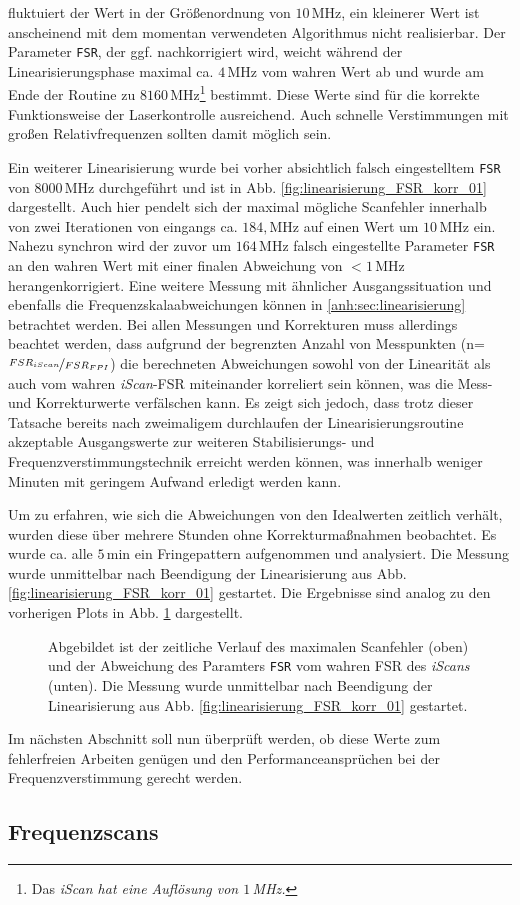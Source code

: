 fluktuiert der Wert in der Größenordnung von $10\,$MHz, ein kleinerer Wert ist
anscheinend mit dem momentan verwendeten Algorithmus nicht realisierbar. Der
Parameter \lstinline|FSR|, der ggf. nachkorrigiert wird, weicht während der
Linearisierungsphase maximal ca. $4\,$MHz vom wahren Wert ab und wurde am Ende
der Routine zu $8160\,$MHz\footnote{Das \textit{iScan hat eine Auflösung von
$1\,$MHz.}} bestimmt. Diese Werte sind für die korrekte Funktionsweise der
Laserkontrolle ausreichend. Auch schnelle Verstimmungen mit großen
Relativfrequenzen sollten damit möglich sein.\par
Ein weiterer Linearisierung wurde bei vorher absichtlich falsch eingestelltem
\lstinline|FSR| von $8000\,$MHz durchgeführt und ist in Abb.
\ref{fig:linearisierung_FSR_korr_01} dargestellt. Auch hier pendelt sich der
maximal mögliche Scanfehler innerhalb von zwei Iterationen von eingangs ca.
$184,$MHz auf einen Wert um $10\,$MHz ein. Nahezu synchron wird der zuvor um
$164\,$MHz falsch eingestellte Parameter \lstinline|FSR| an den wahren Wert
mit einer finalen Abweichung von $<1\,$MHz herangenkorrigiert. Eine weitere
Messung mit ähnlicher Ausgangssituation und ebenfalls die
Frequenzskalaabweichungen können in \ref{anh:sec:linearisierung} betrachtet
werden. Bei allen Messungen und Korrekturen muss allerdings beachtet werden,
dass aufgrund der begrenzten Anzahl von Messpunkten
(n=$\nicefrac{FSR_{iScan}}{FSR_{FPI}}$) die berechneten Abweichungen sowohl von
der Linearität als auch vom wahren \textit{iScan}-FSR miteinander korreliert
sein können, was die Mess- und Korrekturwerte verfälschen kann. Es zeigt sich
jedoch, dass trotz dieser Tatsache bereits nach zweimaligem durchlaufen der
Linearisierungsroutine akzeptable Ausgangswerte zur weiteren Stabilisierungs- und
Frequenzverstimmungstechnik erreicht werden können, was innerhalb weniger
Minuten mit geringem Aufwand erledigt werden kann.\par
Um zu erfahren, wie sich die Abweichungen von den Idealwerten zeitlich verhält,
wurden diese über mehrere Stunden ohne Korrekturmaßnahmen beobachtet. Es wurde
ca. alle $5\,$min ein Fringepattern aufgenommen und analysiert. Die
Messung wurde unmittelbar nach Beendigung der Linearisierung aus Abb.
\ref{fig:linearisierung_FSR_korr_01} gestartet.
Die Ergebnisse sind analog zu den vorherigen Plots in Abb.
\ref{fig:linearitaet_verlauf} dargestellt.
\begin{figure}[h]
 	\centering
 	\footnotesize
	
	\caption[Linearitaet \textit{iScan}, zeitlicher Verlauf]{Abgebildet
	ist der zeitliche Verlauf des maximalen Scanfehler (oben) und der Abweichung
	des Paramters \lstinline|FSR| vom wahren FSR des \textit{iScans} (unten). Die
	Messung wurde unmittelbar nach Beendigung der Linearisierung aus Abb.
	\ref{fig:linearisierung_FSR_korr_01} gestartet.}
	\label{fig:linearitaet_verlauf}
\end{figure}


Im nächsten Abschnitt soll nun überprüft werden, ob diese Werte zum fehlerfreien
Arbeiten genügen und den Performanceansprüchen bei der Frequenzverstimmung gerecht werden.

\subsection{Frequenzscans}\label{sec:frequenz_scans}

